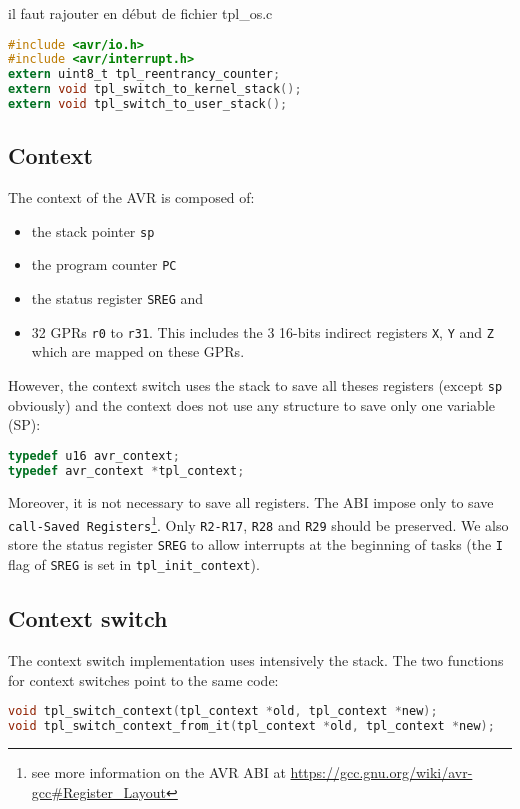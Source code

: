 il faut rajouter en début de fichier tpl_os.c
\begin{lstlisting}[language=C]
#include <avr/io.h>
#include <avr/interrupt.h>
extern uint8_t tpl_reentrancy_counter;
extern void tpl_switch_to_kernel_stack();
extern void tpl_switch_to_user_stack();
\end{lstlisting}




\subsection{Context}
The context of the AVR is composed of:
\begin{itemize}
\item the stack pointer \texttt{sp}
\item the program counter \texttt{PC}
\item the status register \texttt{SREG} and 
\item 32 GPRs \texttt{r0} to \texttt{r31}. This includes the 3 16-bits indirect registers \texttt{X}, \texttt{Y} and \texttt{Z} which are mapped on these GPRs.
\end{itemize}

However, the context switch uses the stack to save all theses registers (except \texttt{sp} obviously) and the context does not use any structure to save only one variable (SP):
\begin{lstlisting}[language=C]
typedef u16 avr_context;
typedef avr_context *tpl_context;
\end{lstlisting}

Moreover, it is not necessary to save all registers. The ABI impose only to save \texttt{call-Saved Registers}\footnote{see more information on the AVR ABI at \url{https://gcc.gnu.org/wiki/avr-gcc\#Register\_Layout}}. Only \texttt{R2-R17}, \texttt{R28} and \texttt{R29} should be preserved. We also store the status register \texttt{SREG} to allow interrupts at the beginning of tasks (the \texttt{I} flag of \texttt{SREG} is set in \texttt{tpl_init_context}).

\subsection{Context switch}
The context switch implementation uses intensively the stack. The two functions for context switches point to the same code:

\begin{lstlisting}[language=C]
void tpl_switch_context(tpl_context *old, tpl_context *new);
void tpl_switch_context_from_it(tpl_context *old, tpl_context *new);
\end{lstlisting}

